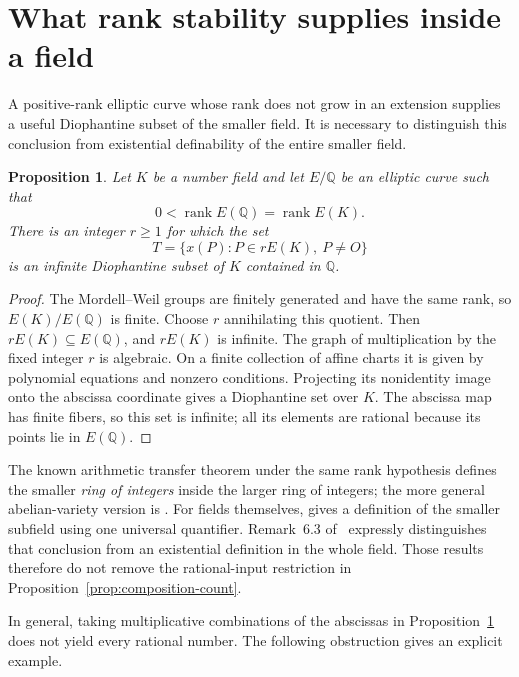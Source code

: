 \documentclass[11pt,a4paper]{article}
\newtheorem{proposition}[theorem]{Proposition}
\theoremstyle{definition}
\newcommand{\Q}{\mathbb Q}
\begin{document}
\section{What rank stability supplies inside a field}

A positive-rank elliptic curve whose rank does not grow in an
extension supplies a useful Diophantine subset of the smaller
field. It is necessary to distinguish this conclusion from
existential definability of the entire smaller field.

\begin{proposition}\label{prop:stable-set}
Let $K$ be a number field and let $E/\Q$ be an elliptic curve
such that
\[
                0<\operatorname{rank}E(\Q)
                         =\operatorname{rank}E(K).
\]
There is an integer $r\ge1$ for which the set
\[
 T=\{x(P):P\in rE(K),\ P\ne O\}
\]
is an infinite Diophantine subset of $K$ contained in $\Q$.
\end{proposition}
\begin{proof}
The Mordell--Weil groups are finitely generated and have the same
rank, so $E(K)/E(\Q)$ is finite. Choose $r$ annihilating this
quotient. Then $rE(K)\subseteq E(\Q)$, and $rE(K)$ is infinite.
The graph of multiplication by the fixed integer $r$ is
algebraic. On a finite collection of affine charts it is given
by polynomial equations and nonzero conditions. Projecting its
nonidentity image onto the abscissa coordinate gives a
Diophantine set over $K$. The abscissa map has finite fibers,
so this set is infinite; all its elements are rational because
its points lie in $E(\Q)$.
\end{proof}

The known arithmetic transfer theorem under the same rank
hypothesis defines the smaller \emph{ring of integers} inside
the larger ring of integers; the more general abelian-variety
version is \cite[Theorem 4.2]{Poonen}. For fields themselves,
\cite[Theorem 4]{CornelissenShlapentokh} gives a definition of
the smaller subfield using one universal quantifier. Remark~6.3 of~\cite{CornelissenShlapentokh} expressly distinguishes
that conclusion from an existential definition in the whole
field. Those results therefore do not remove the rational-input
restriction in Proposition~\ref{prop:composition-count}.

In general, taking multiplicative combinations of the abscissas
in Proposition~\ref{prop:stable-set} does not yield every rational
number. The following obstruction gives an explicit example.
\end{document}
